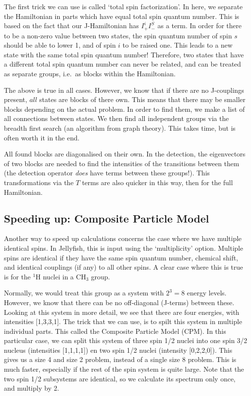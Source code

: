\documentclass[11pt,a4paper]{article}
\begin{document}
The first trick we can use is called `total spin factorization'. In here, we separate the
Hamiltonian in parts which have equal total spin quantum number. This is based on the fact
that our J-Hamiltonian has $I_+^iI_-^S$ as a term. In order for there to be a non-zero
value between two states, the spin quantum number of spin $s$ should be able to lower 1,
and of spin $i$ to be raised one. This leads to a new state with the same total spin
quantum number! Therefore, two states that have a different total spin quantum number can
never be related, and can be treated as separate groups, i.e.\ as blocks within the
Hamiltonian.

The above is true in all cases. However, we know that if there are no J-couplings present,
$all$ states are blocks of there own. This means that there may be smaller blocks
depending on the actual problem. In order to find them, we make a list of all connections
between states. We then find all independent groups via the breadth first search (an
algorithm from graph theory). This takes time, but is often worth it in the end.

All found blocks are diagonalised on their own. In the detection, the eigenvectors of two
blocks are needed to find the intensities of the transitions between them (the detection
operator \textit{does} have terms between these groups!). This transformations via the $T$
terms are also quicker in this way, then for the full Hamiltonian.

\subsection{Speeding up: Composite Particle Model}
Another way to speed up calculations concerns the case where we have multiple identical
spins. In Jellyfish, this is input using the `multiplicity' option. Multiple spins are
identical if they have the same spin quantum number, chemical shift, and identical
couplings (if any) to all other spins. A clear case where this is true is for the $^1$H
nuclei in a CH$_3$ group.

Normally, we would treat this group as a system with $2^3 = 8$ energy levels. However, we
know that there can be no off-diagonal (J-terms) between these. Looking at this system in
more detail, we see that there are four energies, with intensities [1,3,3,1]. The trick
that we can use, is to spilt this system in multiple individual parts. This called the
Composite Particle Model (CPM). In this particular case, we can split this system of three
spin 1/2 nuclei into one spin 3/2 nucleus (intensities [1,1,1,1]) en two spin 1/2 nuclei
(intensity [0,2,2,0]). This gives us a size 4 and size 2 problem, instead of a single
size 8 problem. This is much faster, especially if the rest of the spin system is quite
large. Note that the two spin 1/2 subsystems are identical, so we calculate its spectrum
only once, and multiply by 2.
\end{document}
